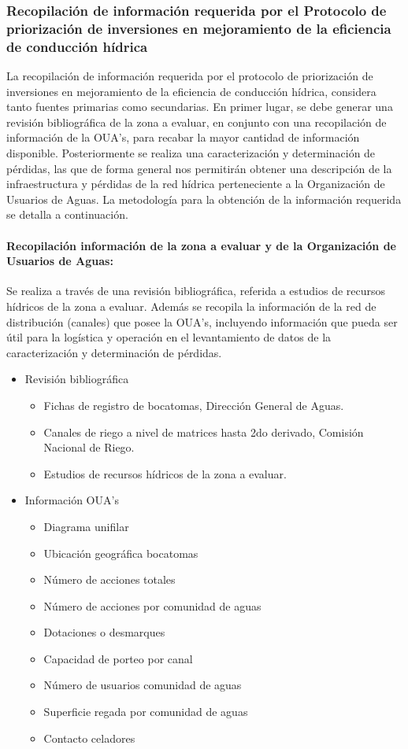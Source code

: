 \documentclass[]{article}
\begin{document}
\subsubsection{Recopilación de información requerida por el Protocolo de priorización de inversiones en mejoramiento de la eficiencia de conducción hídrica}

La recopilación de información requerida por el protocolo de priorización de inversiones en mejoramiento de la eficiencia de conducción hídrica, considera tanto fuentes primarias como secundarias. En primer lugar, se debe generar una revisión bibliográfica de la zona a evaluar, en conjunto con una recopilación de información de la OUA's, para recabar la mayor cantidad de información disponible. Posteriormente se realiza una caracterización y determinación de pérdidas, las que de forma general nos permitirán obtener una descripción de la infraestructura y pérdidas de la red hídrica perteneciente a la Organización de Usuarios de Aguas. La metodología para la obtención de la información requerida se detalla a continuación.

\paragraph{Recopilación información de la zona a evaluar y de la Organización de Usuarios de Aguas:}
Se realiza a través de una revisión bibliográfica, referida a estudios de recursos hídricos de la zona a evaluar. Además se recopila la información de la red de distribución (canales) que posee la OUA's, incluyendo información que pueda ser útil para la logística y operación en el levantamiento de datos de la caracterización y determinación de pérdidas.

\begin{itemize}
	\item Revisión bibliográfica
	\begin{itemize}	
		\item Fichas de registro de bocatomas, Dirección General de Aguas.
		\item Canales de riego a nivel de matrices hasta 2do derivado, Comisión Nacional de Riego.
		\item Estudios de recursos hídricos de la zona a evaluar.
	\end{itemize}
	\item Información OUA's
	\begin{itemize}	
		\item Diagrama unifilar
		\item Ubicación geográfica bocatomas
		\item Número de acciones totales
		\item Número de acciones por comunidad de aguas
		\item Dotaciones o desmarques
		\item Capacidad de porteo por canal
		\item Número de usuarios comunidad de aguas
		\item Superficie regada por comunidad de aguas
		\item Contacto celadores
	\end{itemize}
\end{itemize}	
\end{document}
